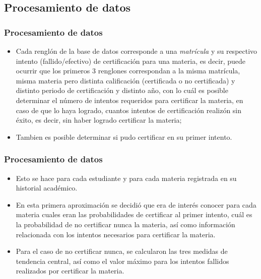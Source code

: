 \documentclass[xcolor=dvipsnames]{beamer}
\begin{document}
\subsection{Procesamiento de datos}

\begin{frame}\frametitle{Procesamiento de datos}
\begin{itemize}

\item Cada rengl\'on de la base de datos corresponde a una \textit{matr\'icula} y su respectivo intento (fallido/efectivo) de certificaci\'on para una materia, es decir, puede ocurrir que los primeros 3 renglones correspondan a la misma matr\'icula, misma materia pero distinta calificaci\'on (certificada o no certificada) y distinto periodo de certificaci\'on y distinto a\~no, con lo cu\'al es posible determinar el n\'umero de intentos requeridos para certificar la materia, en caso de que lo haya logrado, cuantos intentos de certificaci\'on realiz\'on sin \'exito, es decir, sin haber logrado certificar la materia; 

\item Tambien es posible determinar si pudo certificar en su primer intento. 


\end{itemize}
\end{frame}


\begin{frame}\frametitle{Procesamiento de datos}
\begin{itemize}

\item Esto se hace para cada estudiante y para cada materia registrada en su historial acad\'emico. 

\item En esta primera aproximaci\'on se decidi\'o que era de inter\'es conocer para cada materia cuales eran las probabilidades de certificar al primer intento, cu\'al es la probabilidad de no certificar nunca la materia, as\'i como informaci\'on  relacionada con los intentos necesarios para certificar la materia.

\item Para el caso de no certificar nunca, se calcularon las tres medidas de tendencia central, as\'i como el valor m\'aximo para los intentos fallidos realizados por certificar la materia.

\end{itemize}

\end{frame}
\end{document}
